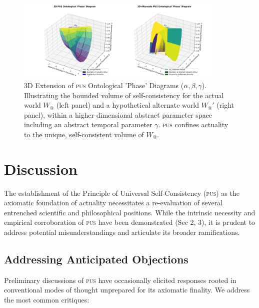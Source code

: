 \documentclass[11pt, a4paper]{article}
\makeatletter
\newcommand{\pus}{\textsc{pus}} %
\newcommand{\Wactual}{W_{@}} %
\makeatother
\begin{document}
\begin{figure}[htbp]
    \centering
    \includegraphics[width=0.9\textwidth]{figures/double_3d_pus_phase_diagram.png} %
    \caption{3D Extension of \pus{} Ontological 'Phase' Diagrams ($\alpha, \beta, \gamma$). Illustrating the bounded volume of self-consistency for the actual world $\Wactual$ (left panel) and a hypothetical alternate world $\Wactual'$ (right panel), within a higher-dimensional abstract parameter space including an abstract temporal parameter $\gamma$. \pus{} confines actuality to the unique, self-consistent volume of $\Wactual$.}
    \label{fig:phase3d}
\end{figure}
\FloatBarrier 

\section{Discussion}
The establishment of the Principle of Universal Self-Consistency (\pus) as the axiomatic foundation of actuality necessitates a re-evaluation of several entrenched scientific and philosophical positions. While the intrinsic necessity and empirical corroboration of \pus{} have been demonstrated (Sec 2, 3), it is prudent to address potential misunderstandings and articulate its broader ramifications.

\subsection{Addressing Anticipated Objections}
Preliminary discussions of \pus{} have occasionally elicited responses rooted in conventional modes of thought unprepared for its axiomatic finality. We address the most common critiques:
\end{document}
